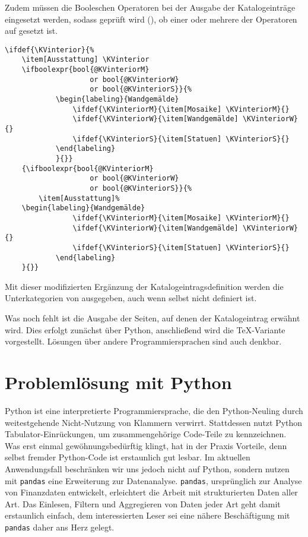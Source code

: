 \documentclass[ngerman]{dtk}
\begin{document}
Zudem müssen die Booleschen Operatoren bei der Ausgabe der Katalogeinträge eingesetzt werden,
sodass geprüft wird (), ob einer oder mehrere der Operatoren auf  gesetzt ist.
\begin{lstlisting}[style=number]
\ifdef{\KVinterior}{%
	\item[Ausstattung] \KVinterior 
	\ifboolexpr{bool{@KVinteriorM} 
					or bool{@KVinteriorW} 
					or bool{@KVinteriorS}}{%
			\begin{labeling}{Wandgemälde}
				\ifdef{\KVinteriorM}{\item[Mosaike] \KVinteriorM}{}
				\ifdef{\KVinteriorW}{\item[Wandgemälde] \KVinteriorW}{}
				\ifdef{\KVinteriorS}{\item[Statuen] \KVinteriorS}{}
			\end{labeling}
			}{}}
	{\ifboolexpr{bool{@KVinteriorM} 
					or bool{@KVinteriorW} 
					or bool{@KVinteriorS}}{%
		\item[Ausstattung]%
	\begin{labeling}{Wandgemälde}	
				\ifdef{\KVinteriorM}{\item[Mosaike] \KVinteriorM}{}
				\ifdef{\KVinteriorW}{\item[Wandgemälde] \KVinteriorW}{}
				\ifdef{\KVinteriorS}{\item[Statuen] \KVinteriorS}{}
			\end{labeling}
	}{}}
\end{lstlisting}
Mit dieser modifizierten Ergänzung der Katalogeintragsdefinition werden die Unterkategorien von  ausgegeben, 
auch wenn  selbst nicht definiert ist.


Was noch fehlt ist die Ausgabe der Seiten, auf denen der Katalogeintrag
 erwähnt wird. 
Dies erfolgt zunächst über Python, 
anschließend wird die \TeX -Variante vorgestellt.
Lösungen über andere Programmiersprachen sind auch denkbar.

\section{Problemlösung mit Python}

Python ist eine interpretierte Programmiersprache, die den Python-Neuling
durch weitestgehende Nicht-Nutzung von Klammern verwirrt. 
Stattdessen nutzt Python Tabulator-Einrückungen, um zusammengehörige 
Code-Teile zu kennzeichnen. Was erst einmal gewöhnungsbedürftig klingt, 
hat in der Praxis Vorteile, denn selbst fremder Python-Code ist erstaunlich gut lesbar. 
Im aktuellen Anwendungsfall beschränken wir uns jedoch nicht auf Python, 
sondern nutzen mit  \verb|pandas| eine Erweiterung zur Datenanalyse. 
\verb|pandas|, ursprünglich zur Analyse von Finanzdaten entwickelt, 
erleichtert die Arbeit mit strukturierten Daten aller Art. 
Das Einlesen, Filtern und Aggregieren von Daten jeder Art geht damit 
erstaunlich einfach, dem interessierten Leser sei eine nähere Beschäftigung 
mit \verb|pandas| daher ans Herz gelegt.
\end{document}
